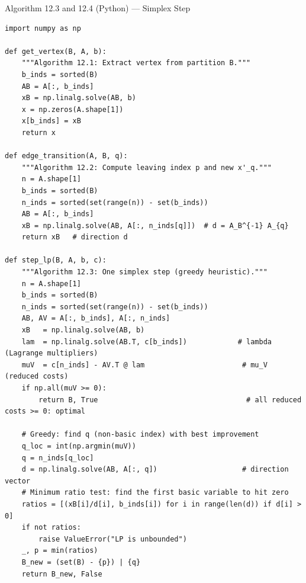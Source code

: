 \documentclass[aspectratio=169,10pt]{beamer}
\begin{document}
\begin{frame}[fragile]{Algorithm 12.3 and 12.4 (Python) --- Simplex Step}
\begin{lstlisting}
import numpy as np

def get_vertex(B, A, b):
    """Algorithm 12.1: Extract vertex from partition B."""
    b_inds = sorted(B)
    AB = A[:, b_inds]
    xB = np.linalg.solve(AB, b)
    x = np.zeros(A.shape[1])
    x[b_inds] = xB
    return x

def edge_transition(A, B, q):
    """Algorithm 12.2: Compute leaving index p and new x'_q."""
    n = A.shape[1]
    b_inds = sorted(B)
    n_inds = sorted(set(range(n)) - set(b_inds))
    AB = A[:, b_inds]
    xB = np.linalg.solve(AB, A[:, n_inds[q]])  # d = A_B^{-1} A_{q}
    return xB   # direction d

def step_lp(B, A, b, c):
    """Algorithm 12.3: One simplex step (greedy heuristic)."""
    n = A.shape[1]
    b_inds = sorted(B)
    n_inds = sorted(set(range(n)) - set(b_inds))
    AB, AV = A[:, b_inds], A[:, n_inds]
    xB   = np.linalg.solve(AB, b)
    lam  = np.linalg.solve(AB.T, c[b_inds])            # lambda (Lagrange multipliers)
    muV  = c[n_inds] - AV.T @ lam                       # mu_V (reduced costs)
    if np.all(muV >= 0):
        return B, True                                   # all reduced costs >= 0: optimal

    # Greedy: find q (non-basic index) with best improvement
    q_loc = int(np.argmin(muV))
    q = n_inds[q_loc]
    d = np.linalg.solve(AB, A[:, q])                    # direction vector
    # Minimum ratio test: find the first basic variable to hit zero
    ratios = [(xB[i]/d[i], b_inds[i]) for i in range(len(d)) if d[i] > 0]
    if not ratios:
        raise ValueError("LP is unbounded")
    _, p = min(ratios)
    B_new = (set(B) - {p}) | {q}
    return B_new, False
\end{lstlisting}
\end{frame}
\end{document}
